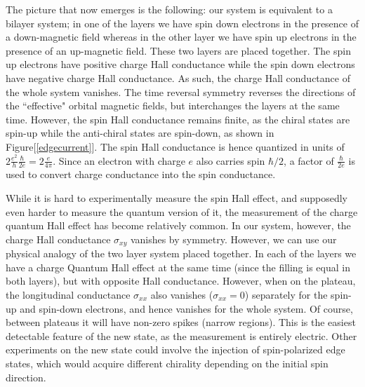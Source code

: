 \documentclass[prl,aps,amssymb,shownopacs,twocolumn]{revtex4}
\begin{document}
	
	The picture that now emerges is the following: our system is
	equivalent to a bilayer system; in one of the layers we have spin
	down electrons in the presence of a down-magnetic field whereas in
	the other layer we have spin up electrons in the presence of an
	up-magnetic field. These two layers are placed together. The spin up
	electrons have positive charge Hall conductance while the spin down
	electrons have negative charge Hall conductance. As such, the charge
	Hall conductance of the whole system vanishes. The time reversal
	symmetry reverses the directions of the ``effective" orbital
	magnetic fields, but interchanges the layers at the same time.
	However, the spin Hall conductance remains finite, as the chiral
	states are spin-up while the anti-chiral states are spin-down, as
	shown in Figure[\ref{edgecurrent}]. The spin Hall conductance is
	hence quantized in units of $2 \frac{e^2}{h}
	\frac{\hbar}{2e}=2\frac{e}{4\pi}$. Since an electron with charge $e$
	also carries spin $\hbar/2$, a factor of $\frac{\hbar}{2e}$ is used
	to convert charge conductance into the spin conductance.
	
	
	While it is hard to experimentally measure the spin Hall effect, and
	supposedly even harder to measure the quantum version of it, the
	measurement of the charge quantum Hall effect has become relatively
	common. In our system, however, the charge Hall conductance
	$\sigma_{xy}$ vanishes by symmetry. However, we can use our physical
	analogy of the two layer system placed together. In each of the
	layers we have a charge Quantum Hall effect at the same time (since
	the filling is equal in both layers), but with opposite Hall
	conductance. However, when on the plateau, the longitudinal
	conductance $\sigma_{xx}$ also vanishes ($\sigma_{xx} =0$)
	separately for the spin-up and spin-down electrons, and hence
	vanishes for the whole system. Of course, between plateaus it will
	have non-zero spikes (narrow regions). This is the easiest
	detectable feature of the new state, as the measurement is entirely
	electric. Other experiments on the new state could involve the
	injection of spin-polarized edge states, which would acquire
	different chirality depending on the initial spin direction.
	
\end{document}
